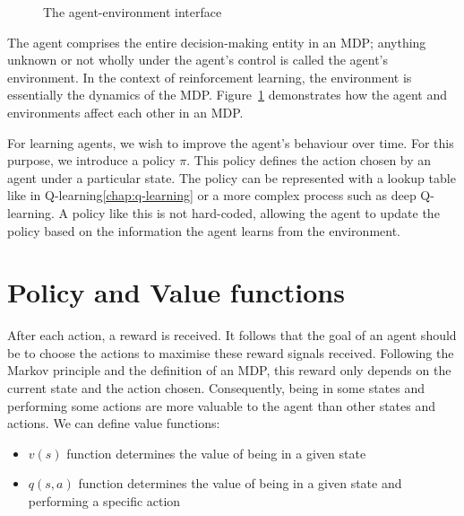 \documentclass[]{final_report}
\begin{document}
\begin{figure}[H]
  \centering
  \fboxsep 2mm
  \caption{\label{fig:agent-enviroment} The agent-environment interface}
\end{figure}


The agent comprises the entire decision-making entity in an MDP; anything unknown or not wholly under the agent's control is called the agent's environment. In the context of reinforcement learning, the environment is essentially the dynamics of the MDP. Figure~\ref{fig:agent-enviroment} demonstrates how the agent and environments affect each other in an MDP. 

\label{policy-informal-definition}
For learning agents, we wish to improve the agent's behaviour over time. For this purpose, we introduce a policy $\pi$. This policy defines the action chosen by an agent under a particular state. The policy can be represented with a lookup table like in Q-learning\ref{chap:q-learning} or a more complex process such as deep Q-learning. A policy like this is not hard-coded, allowing the agent to update the policy based on the information the agent learns from the environment. 


\section{Policy and Value functions}

After each action, a reward is received. It follows that the goal of an agent should be to choose the actions to maximise these reward signals received. Following the Markov principle and the definition of an MDP, this reward only depends on the current state and the action chosen. Consequently, being in some states and performing some actions are more valuable to the agent than other states and actions. We can define value functions: 
\begin{itemize}
  \item $v(s)$ function determines the value of being in a given state
  \item $q(s, a)$ function determines the value of being in a given state and performing a specific action
\end{itemize}
\end{document}
